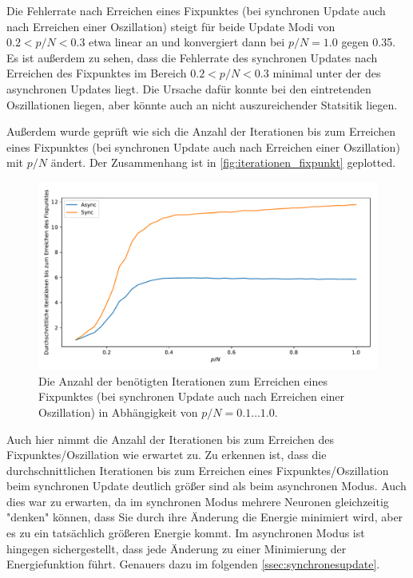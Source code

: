 Die Fehlerrate nach Erreichen eines Fixpunktes (bei synchronen Update auch nach Erreichen einer Oszillation) steigt für beide Update Modi von $0.2 < p/N < 0.3$ etwa linear an und konvergiert dann bei $p/N = 1.0$ gegen 0.35. Es ist außerdem zu sehen, dass die Fehlerrate des synchronen Updates nach Erreichen des Fixpunktes im Bereich $0.2 < p/N < 0.3$ minimal unter der des asynchronen Updates liegt. Die Ursache dafür konnte bei den eintretenden Oszillationen liegen, aber könnte auch an nicht auszureichender Statsitik liegen.

Außerdem wurde geprüft wie sich die Anzahl der Iterationen bis zum Erreichen eines Fixpunktes (bei synchronen Update auch nach Erreichen einer Oszillation) mit $p/N$ ändert. Der Zusammenhang ist in \autoref{fig:iterationen_fixpunkt} geplotted. 

\begin{figure}[htp]
	\centering
	\includegraphics[width = \textwidth]{images/4_1/iterationen_fixpunkt_1000.pdf}
	\caption{Die Anzahl der benötigten Iterationen zum Erreichen eines Fixpunktes (bei synchronen Update auch nach Erreichen einer Oszillation) in Abhängigkeit von $p / N = 0.1 \dots 1.0$.}
	\label{fig:iterationen_fixpunkt}
\end{figure}

Auch hier nimmt die Anzahl der Iterationen bis zum Erreichen des Fixpunktes/Oszillation wie erwartet zu. Zu erkennen ist, dass die durchschnittlichen Iterationen bis zum Erreichen eines Fixpunktes/Oszillation beim synchronen Update deutlich größer sind als beim asynchronen Modus. Auch dies war zu erwarten, da im synchronen Modus mehrere Neuronen  gleichzeitig "denken" können, dass Sie durch ihre Änderung die Energie minimiert wird, aber es zu ein tatsächlich größeren Energie kommt. Im asynchronen Modus ist hingegen sichergestellt, dass jede Änderung zu einer Minimierung der Energiefunktion führt. Genauers dazu im folgenden \autoref{ssec:synchronesupdate}.


